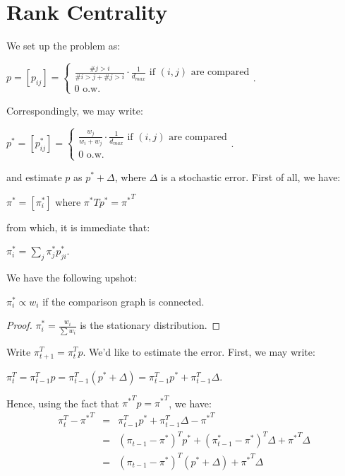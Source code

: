 \documentclass[letterpaper, 11pt, reqno]{amsart}
\begin{document}
\section{Rank Centrality}
	We set up the problem as:
		\begin{center}
			$\displaystyle p = [p_{ij}] = \begin{cases} \frac{\# j > i}{\# i>j + \# j>i} \cdot \frac{1}{d_{max}} \mbox{ if } (i, j) \mbox{ are compared} \\ 0 \mbox { o.w. }\end{cases}$.
		\end{center}
	
	Correspondingly, we may write:
		\begin{center}
			$\displaystyle p^*= [p_{ij}^*] = \begin{cases} \frac{w_j}{w_i + w_j} \cdot \frac{1}{d_{max}} \mbox{ if } (i, j) \mbox{ are compared} \\ 0 \mbox { o.w. }\end{cases}$.
		\end{center}

	and estimate $p$ as $p^* + \Delta$, where $\Delta$ is a stochastic error. First of all, we have:
		\begin{center}
			$\pi^* = [\pi_i^*]$ where $\pi^* T p^* = {\pi^*}^T$
		\end{center}
	from which, it is immediate that:
		\begin{center}
			$\pi_i^* = \sum_j \pi_j^* p_{ji}^*$.
		\end{center}
	
	We have the following upshot:
		\begin{claim} $\pi_i^* \propto w_i$ if the comparison graph is connected.
			\begin{proof}
				$\displaystyle \pi_i^* = \frac{w_i}{\sum w_i}$ is the stationary distribution.
			\end{proof}
		\end{claim}
	
	Write $\pi_{t+1}^T = \pi_t^T p$. We'd like to estimate the error. First, we may write:
		\begin{center}
			$\pi_t^T = \pi_{t-1}^T p = \pi_{t-1}^T (p^* + \Delta) = \pi_{t-1}^T p^* + \pi_{t-1}^T \Delta$.
		\end{center}

	Hence, using the fact that ${\pi^*}^T p = {\pi^*}^T$, we have:
		\begin{eqnarray*}
			\pi_t^T - {\pi^*}^T &=& \pi_{t-1}^T p^* + \pi_{t-1}^T \Delta - {\pi^*}^T \\
			&=& (\pi_{t-1} - \pi^*)^T p^* + (\pi_{t-1}^* - \pi^*)^T \Delta + {\pi^*}^T \Delta \\
			&=& (\pi_{t-1} - \pi^*)^T(p^* + \Delta) + {\pi^*}^T \Delta
		\end{eqnarray*}
	
\end{document}
